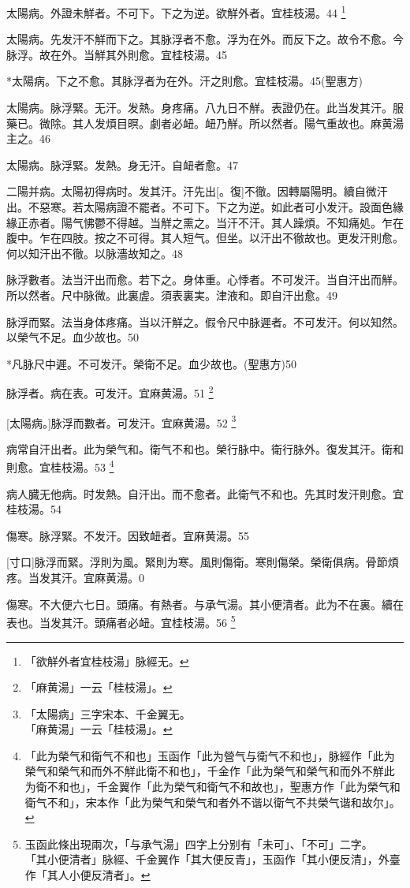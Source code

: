 \documentclass[12pt,twoside,UTF8,b5paper]{ctexbook}
\begin{document}
太陽病。外證未觧者。不可下。下之为逆。欲觧外者。宜桂枝湯。44
	\footnote{「欲觧外者宜桂枝湯」脉經无。}

太陽病。先发汗不觧而下之。其脉浮者不愈。浮为在外。而反下之。故令不愈。今脉浮。故在外。当觧其外則愈。宜桂枝湯。45

*太陽病。下之不愈。其脉浮者为在外。汗之則愈。宜桂枝湯。45(聖惠方)

太陽病。脉浮緊。无汗。发熱。身疼痛。八九日不觧。表證仍在。此当发其汗。服藥已。微除。其人发煩目暝。劇者必衄。衄乃觧。所以然者。陽气重故也。麻黄湯主之。46

太陽病。脉浮緊。发熱。身无汗。自衄者愈。47

二陽并病。太陽初得病时。发其汗。汗先出[。復]不徹。因轉屬陽明。續自微汗出。不惡寒。若太陽病證不罷者。不可下。下之为逆。如此者可小发汗。設面色緣緣正赤者。陽气怫鬱不得越。当觧之熏之。当汗不汗。其人躁煩。不知痛処。乍在腹中。乍在四肢。按之不可得。其人短气。但坐。以汗出不徹故也。更发汗則愈。何以知汗出不徹。以脉濇故知之。48

脉浮數者。法当汗出而愈。若下之。身体重。心悸者。不可发汗。当自汗出而觧。所以然者。尺中脉微。此裏虗。須表裏実。津液和。即自汗出愈。49

脉浮而緊。法当身体疼痛。当以汗觧之。假令尺中脉遲者。不可发汗。何以知然。以榮气不足。血少故也。50

*凡脉尺中遲。不可发汗。榮衛不足。血少故也。(聖惠方)50

脉浮者。病在表。可发汗。宜麻黄湯。51
	\footnote{「麻黄湯」一云「桂枝湯」。}

[太陽病。]脉浮而數者。可发汗。宜麻黄湯。52
	\footnote{「太陽病」三字宋本、千金翼无。\\「麻黄湯」一云「桂枝湯」。}

病常自汗出者。此为榮气和。衛气不和也。榮行脉中。衛行脉外。復发其汗。衛和則愈。宜桂枝湯。53
	\footnote{「此为榮气和衛气不和也」玉函作「此为營气与衛气不和也」，脉經作「此为榮气和榮气和而外不觧此衛不和也」，千金作「此为榮气和榮气和而外不觧此为衛不和也」，千金翼作「此为榮气和衛气不和故也」，聖惠方作「此为榮气和衛气不和」，宋本作「此为榮气和榮气和者外不谐以衛气不共榮气谐和故尔」。}

病人臓无他病。时发熱。自汗出。而不愈者。此衛气不和也。先其时发汗則愈。宜桂枝湯。54

傷寒。脉浮緊。不发汗。因致衄者。宜麻黄湯。55

[寸口]脉浮而緊。浮則为風。緊則为寒。風則傷衛。寒則傷榮。榮衛俱病。骨節煩疼。当发其汗。宜麻黄湯。0

傷寒。不大便六七日。頭痛。有熱者。与承气湯。其小便清者。此为不在裏。續在表也。当发其汗。頭痛者必衄。宜桂枝湯。56
	\footnote{玉函此條出現兩次，「与承气湯」四字上分别有「未可」、「不可」二字。\\「其小便清者」脉經、千金翼作「其大便反青」，玉函作「其小便反清」，外臺作「其人小便反清者」。}
\end{document}
